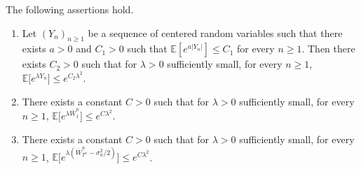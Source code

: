 \documentclass[AHL,XML,longabstracts,Unicode]{cedram}
\newcommand{\E}{\mathbb{E}}
\newcommand\Es[1]{\mathbb{E}\left[#1\right]}
\begin{document}
 \begin{lemma}
 \label{lem:moments}
 The following assertions hold.
 \begin{enumerate}
 \item[(i)] Let $(Y_{n})_{n \geq 1}$ be a sequence of centered random variables such that there exists $a>0$ and $C_{1}>0$ such that $\Es{e^{a|Y_{n}|}} \leq C_{1}$ for every $n \geq 1$. Then there exists $C_{2}>0$ such that for $\lambda>0$ sufficiently small, for every $n \geq 1$, $\E\big[e^{\lambda Y_{n}}\big] \leq e^{C_{2} \lambda ^{2}}$.
 \item[(ii)]  There exists a constant $C>0$ such that for $\lambda>0$ sufficiently small, for every $n  \geq 1$, $\E\big[e^{\lambda \overline{W}^{n}_{1}}\big] \leq e^{C \lambda ^{2}}$.
 \item[(iii)] There exists a constant $C>0$ such that for $\lambda>0$ sufficiently small, for every $n \geq 1$, $\E\big[{e^{\lambda(\overline{W}^{n}_{T^{n}} - {\sigma_{n}^{2}}/{2} ) }}\big] \leq e^{C \lambda ^{2}}$.
 \end{enumerate}
 \end{lemma}
\end{document}
